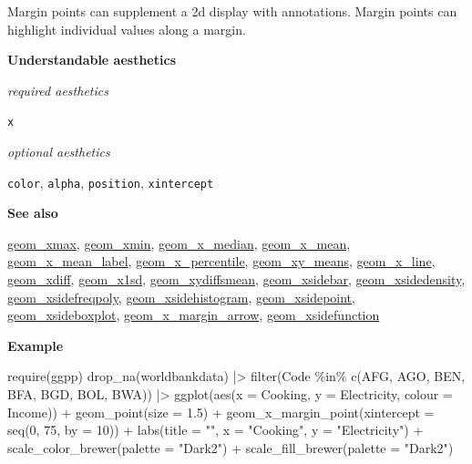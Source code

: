 \documentclass[
  letterpaper,
  DIV=11,
  numbers=noendperiod]{scrreprt}
\newenvironment{Shaded}{\begin{snugshade}}{\end{snugshade}}
\newcommand{\AttributeTok}[1]{\textcolor[rgb]{0.40,0.45,0.13}{#1}}
\newcommand{\DecValTok}[1]{\textcolor[rgb]{0.68,0.00,0.00}{#1}}
\newcommand{\FloatTok}[1]{\textcolor[rgb]{0.68,0.00,0.00}{#1}}
\newcommand{\FunctionTok}[1]{\textcolor[rgb]{0.28,0.35,0.67}{#1}}
\newcommand{\NormalTok}[1]{\textcolor[rgb]{0.00,0.23,0.31}{#1}}
\newcommand{\SpecialCharTok}[1]{\textcolor[rgb]{0.37,0.37,0.37}{#1}}
\newcommand{\StringTok}[1]{\textcolor[rgb]{0.13,0.47,0.30}{#1}}
\begin{document}
Margin points can supplement a 2d display with annotations. Margin
points can highlight individual values along a margin.

\textbf{Understandable aesthetics}

\emph{required aesthetics}

\texttt{x}

\emph{optional aesthetics}

\texttt{color}, \texttt{alpha}, \texttt{position}, \texttt{xintercept}

\textbf{See also}

\href{@xmax}{geom\_xmax}, \href{@xmin}{geom\_xmin},
\href{@x_median}{geom\_x\_median}, \href{@x_mean}{geom\_x\_mean},
\href{@x_mean_label}{geom\_x\_mean\_label},
\href{@x_percentile}{geom\_x\_percentile},
\href{@xy_means}{geom\_xy\_means}, \href{@x_line}{geom\_x\_line},
\href{@xdiff}{geom\_xdiff}, \href{@x1sd}{geom\_x1sd},
\href{@xydiffsmean}{geom\_xydiffsmean},
\href{@xsidebar}{geom\_xsidebar},
\href{@xsidedensity}{geom\_xsidedensity},
\href{@xsidefreqpoly}{geom\_xsidefreqpoly},
\href{@xsidehistogram}{geom\_xsidehistogram},
\href{@xsidepoint}{geom\_xsidepoint},
\href{@xsideboxplot}{geom\_xsideboxplot},
\href{@x_margin_arrow}{geom\_x\_margin\_arrow},
\href{@xsidefunction}{geom\_xsidefunction}

\textbf{Example}

\begin{Shaded}
\begin{Highlighting}[]
\FunctionTok{require}\NormalTok{(ggpp)}
\FunctionTok{drop\_na}\NormalTok{(worldbankdata) }\SpecialCharTok{|\textgreater{}}
  \FunctionTok{filter}\NormalTok{(Code }\SpecialCharTok{\%in\%} \FunctionTok{c}\NormalTok{(}\StringTok{\textquotesingle{}AFG\textquotesingle{}}\NormalTok{, }\StringTok{\textquotesingle{}AGO\textquotesingle{}}\NormalTok{, }\StringTok{\textquotesingle{}BEN\textquotesingle{}}\NormalTok{, }\StringTok{\textquotesingle{}BFA\textquotesingle{}}\NormalTok{, }\StringTok{\textquotesingle{}BGD\textquotesingle{}}\NormalTok{, }\StringTok{\textquotesingle{}BOL\textquotesingle{}}\NormalTok{, }\StringTok{\textquotesingle{}BWA\textquotesingle{}}\NormalTok{)) }\SpecialCharTok{|\textgreater{}} 
  \FunctionTok{ggplot}\NormalTok{(}\FunctionTok{aes}\NormalTok{(}\AttributeTok{x =}\NormalTok{ Cooking, }\AttributeTok{y =}\NormalTok{ Electricity, }\AttributeTok{colour =}\NormalTok{ Income)) }\SpecialCharTok{+}
  \FunctionTok{geom\_point}\NormalTok{(}\AttributeTok{size =} \FloatTok{1.5}\NormalTok{) }\SpecialCharTok{+} 
  \FunctionTok{geom\_x\_margin\_point}\NormalTok{(}\AttributeTok{xintercept =} \FunctionTok{seq}\NormalTok{(}\DecValTok{0}\NormalTok{, }\DecValTok{75}\NormalTok{, }\AttributeTok{by =} \DecValTok{10}\NormalTok{)) }\SpecialCharTok{+}
  \FunctionTok{labs}\NormalTok{(}\AttributeTok{title =} \StringTok{""}\NormalTok{, }\AttributeTok{x =} \StringTok{"Cooking"}\NormalTok{, }\AttributeTok{y =} \StringTok{"Electricity"}\NormalTok{) }\SpecialCharTok{+} \FunctionTok{scale\_color\_brewer}\NormalTok{(}\AttributeTok{palette =} \StringTok{"Dark2"}\NormalTok{) }\SpecialCharTok{+} \FunctionTok{scale\_fill\_brewer}\NormalTok{(}\AttributeTok{palette =} \StringTok{"Dark2"}\NormalTok{)}
\end{Highlighting}
\end{Shaded}
\end{document}
